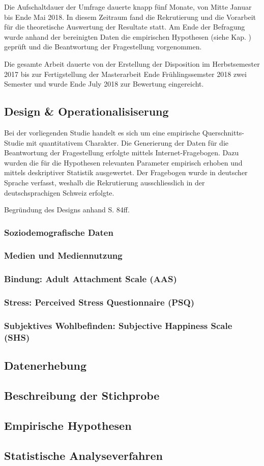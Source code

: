 Die Aufschaltdauer der Umfrage dauerte knapp fünf Monate, von Mitte Januar bis Ende Mai 2018. In diesem Zeitraum fand die Rekrutierung und die Vorarbeit für die theoretische Auswertung der Resultate statt. Am Ende der Befragung wurde anhand der bereinigten Daten die empirischen Hypothesen (siehe Kap. ) geprüft und die Beantwortung der Fragestellung vorgenommen.

Die gesamte Arbeit dauerte von der Erstellung der Disposition im Herbstsemester 2017 bis zur Fertigstellung der Masterarbeit Ende Frühlingssemster 2018 zwei Semester und wurde Ende July 2018 zur Bewertung eingereicht.

\subsection{Design \& Operationalisiserung} \label{sec:Design}
Bei der vorliegenden Studie handelt es sich um eine empirische Querschnitts-Studie mit quantitativem Charakter. Die Generierung der Daten für die Beantwortung der Fragestellung erfolgte mittels Internet-Fragebogen. Dazu wurden die für die Hypothesen relevanten Parameter empirisch erhoben und mittels deskriptiver Statistik ausgewertet. Der Fragebogen wurde in deutscher Sprache verfasst, weshalb die Rekrutierung ausschliesslich in der deutschsprachigen Schweiz erfolgte.

Begründung des Designs anhand  S. 84ff.

\subsubsection{Soziodemografische Daten}\label{sec:SoziodemografischeDaten}
\subsubsection{Medien und Mediennutzung}\label{sec:MedienMediennutzung}
\subsubsection{Bindung: Adult Attachment Scale (AAS)}\label{sec:AAS}
\subsubsection{Stress: Perceived Stress Questionnaire (PSQ)}\label{sec:PSQ}
\subsubsection{Subjektives Wohlbefinden: Subjective Happiness Scale (SHS)}\label{sec:SWB}


\subsection{Datenerhebung}
\subsection{Beschreibung der Stichprobe}
\subsection{Empirische Hypothesen}\label{sec:EmpirischeHypothesen}
\subsection{Statistische Analyseverfahren}
